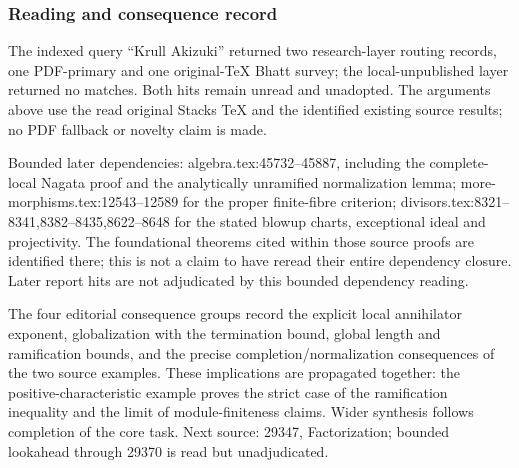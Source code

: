\subsubsection{Reading and consequence record}\label{reading-and-consequence-record}

The indexed query ``Krull Akizuki'' returned two research-layer routing records, one PDF-primary and one original-TeX Bhatt survey; the local-unpublished layer returned no matches. Both hits remain unread and unadopted. The arguments above use the read original Stacks TeX and the identified existing source results; no PDF fallback or novelty claim is made.

Bounded later dependencies: algebra.tex:45732--45887, including the complete-local Nagata proof and the analytically unramified normalization lemma; more-morphisms.tex:12543--12589 for the proper finite-fibre criterion; divisors.tex:8321--8341,8382--8435,8622--8648 for the stated blowup charts, exceptional ideal and projectivity. The foundational theorems cited within those source proofs are identified there; this is not a claim to have reread their entire dependency closure. Later report hits are not adjudicated by this bounded dependency reading.

The four editorial consequence groups record the explicit local annihilator exponent, globalization with the termination bound, global length and ramification bounds, and the precise completion/normalization consequences of the two source examples. These implications are propagated together: the positive-characteristic example proves the strict case of the ramification inequality and the limit of module-finiteness claims. Wider synthesis follows completion of the core task. Next source: 29347, Factorization; bounded lookahead through 29370 is read but unadjudicated.
